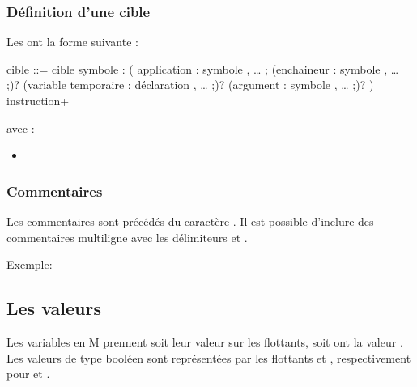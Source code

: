 \documentclass[letterpaper,10pt,french]{sphinxmanual}
\begin{document}
\subsubsection{Définition d’une cible}
\label{\detokenize{syntax:definition-d-une-cible}}
\sphinxAtStartPar
Les  ont la forme suivante :

\begin{sphinxVerbatim}[commandchars=\\\{\}]
\PYGZlt{}cible\PYGZgt{} ::= 
  cible \PYGZlt{}symbole\PYGZgt{} : 
  ( 
    application : \PYGZlt{}symbole\PYGZgt{} , … ; 
    \PYGZca{}\PYGZca{} (enchaineur : \PYGZlt{}symbole\PYGZgt{} , … ;)? 
    \PYGZca{}\PYGZca{} (variable temporaire : \PYGZlt{}déclaration\PYGZgt{} , … ;)? 
    \PYGZca{}\PYGZca{} (argument : \PYGZlt{}symbole\PYGZgt{} , … ;)?    
  ) 
  \PYGZlt{}instruction\PYGZgt{}+
\end{sphinxVerbatim}

\sphinxAtStartPar
avec :
\begin{itemize}
\item {} 
\sphinxAtStartPar
{}

\end{itemize}


\subsubsection{Commentaires}
\label{\detokenize{syntax:commentaires}}
\sphinxAtStartPar
Les commentaires sont précédés du caractère \sphinxcode{\sphinxupquote{\#}}.
Il est possible d’inclure des commentaires multi\sphinxhyphen{}ligne avec les délimiteurs \sphinxcode{\sphinxupquote{\#\{}} et
\sphinxcode{\sphinxupquote{\}\#}}.

\sphinxAtStartPar
Exemple:

\begin{sphinxVerbatim}[commandchars=\\\{\}]
      
\end{sphinxVerbatim}


\subsection{Les valeurs}
\label{\detokenize{syntax:les-valeurs}}\label{\detokenize{syntax:valeurs}}
\sphinxAtStartPar
Les variables en M prennent soit leur valeur sur les flottants, soit ont la
valeur .
Les valeurs de type booléen sont représentées par les flottants  et
, respectivement pour  et .
\end{document}
